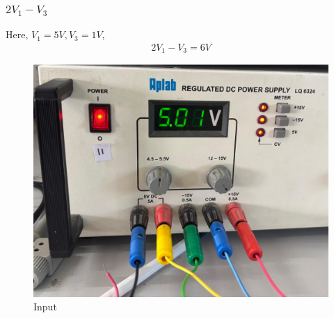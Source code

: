 \documentclass[a4paper,12pt]{article}
\begin{document}
\subsubsection*{$2V_1 - V_3$}
Here, $V_1 = 5V, V_3 = 1V$, \begin{align*}2V_1-V_3 = 6V\end{align*}
\begin{figure}[h!]
   \centering
   \includegraphics[scale = 0.2]{figs/input2.png}
   \caption{Input}
\end{figure}
\end{document}
